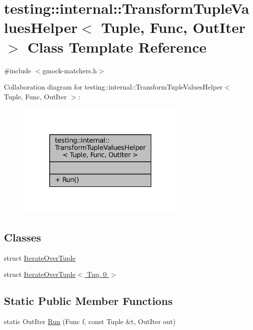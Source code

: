 \hypertarget{classtesting_1_1internal_1_1TransformTupleValuesHelper}{}\section{testing\+:\+:internal\+:\+:Transform\+Tuple\+Values\+Helper$<$ Tuple, Func, Out\+Iter $>$ Class Template Reference}
\label{classtesting_1_1internal_1_1TransformTupleValuesHelper}


{\ttfamily \#include $<$gmock-\/matchers.\+h$>$}



Collaboration diagram for testing\+:\+:internal\+:\+:Transform\+Tuple\+Values\+Helper$<$ Tuple, Func, Out\+Iter $>$\+:
\nopagebreak
\begin{figure}[H]
\begin{center}
\leavevmode
\includegraphics[width=235pt]{classtesting_1_1internal_1_1TransformTupleValuesHelper__coll__graph}
\end{center}
\end{figure}
\subsection*{Classes}
\begin{DoxyCompactItemize}
\item 
struct \hyperlink{structtesting_1_1internal_1_1TransformTupleValuesHelper_1_1IterateOverTuple}{Iterate\+Over\+Tuple}
\item 
struct \hyperlink{structtesting_1_1internal_1_1TransformTupleValuesHelper_1_1IterateOverTuple_3_01Tup_00_010_01_4}{Iterate\+Over\+Tuple$<$ Tup, 0 $>$}
\end{DoxyCompactItemize}
\subsection*{Static Public Member Functions}
\begin{DoxyCompactItemize}
\item 
static Out\+Iter \hyperlink{classtesting_1_1internal_1_1TransformTupleValuesHelper_a27773f284f43c712ec72923a872d35fc}{Run} (Func f, const Tuple \&t, Out\+Iter out)
\end{DoxyCompactItemize}
